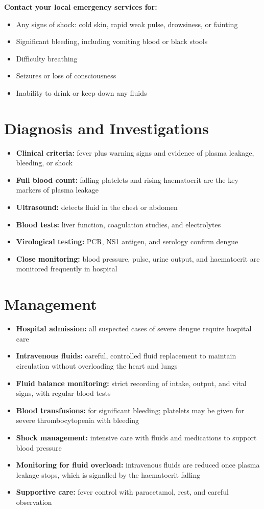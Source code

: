 \textbf{Contact your local emergency services for:}
\begin{itemize}
    \item Any signs of shock: cold skin, rapid weak pulse, drowsiness, or fainting
    \item Significant bleeding, including vomiting blood or black stools
    \item Difficulty breathing
    \item Seizures or loss of consciousness
    \item Inability to drink or keep down any fluids
\end{itemize}

\section*{Diagnosis and Investigations}
\begin{itemize}
    \item \textbf{Clinical criteria:} fever plus warning signs and evidence of plasma leakage, bleeding, or shock
    \item \textbf{Full blood count:} falling platelets and rising haematocrit are the key markers of plasma leakage
    \item \textbf{Ultrasound:} detects fluid in the chest or abdomen
    \item \textbf{Blood tests:} liver function, coagulation studies, and electrolytes
    \item \textbf{Virological testing:} PCR, NS1 antigen, and serology confirm dengue
    \item \textbf{Close monitoring:} blood pressure, pulse, urine output, and haematocrit are monitored frequently in hospital
\end{itemize}

\section*{Management}
\begin{itemize}
    \item \textbf{Hospital admission:} all suspected cases of severe dengue require hospital care
    \item \textbf{Intravenous fluids:} careful, controlled fluid replacement to maintain circulation without overloading the heart and lungs
    \item \textbf{Fluid balance monitoring:} strict recording of intake, output, and vital signs, with regular blood tests
    \item \textbf{Blood transfusions:} for significant bleeding; platelets may be given for severe thrombocytopenia with bleeding
    \item \textbf{Shock management:} intensive care with fluids and medications to support blood pressure
    \item \textbf{Monitoring for fluid overload:} intravenous fluids are reduced once plasma leakage stops, which is signalled by the haematocrit falling
    \item \textbf{Supportive care:} fever control with paracetamol, rest, and careful observation
\end{itemize}

